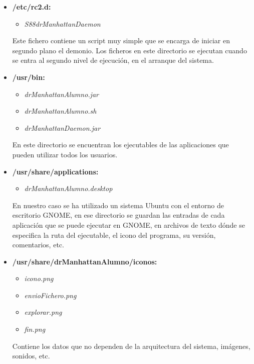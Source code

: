 \begin{itemize}

    \item {\bfseries /etc/rc2.d:}
    \begin{itemize}
        \item \emph{S88drManhattanDaemon}
    \end{itemize}

    Este fichero contiene un script muy simple que se encarga de iniciar en segundo plano el demonio. Los ficheros en este directorio se ejecutan cuando se entra al segundo nivel de ejecución, en el arranque del sistema.


    \item {\bfseries /usr/bin:}
    \begin{itemize}
        \item \emph{drManhattanAlumno.jar}
        \item \emph{drManhattanAlumno.sh}
        \item \emph{drManhattanDaemon.jar}
    \end{itemize}

    En este directorio se encuentran los ejecutables de las aplicaciones que pueden utilizar todos los usuarios.

    \item {\bfseries /usr/share/applications:}
    \begin{itemize}
        \item \emph{drManhattanAlumno.desktop}
    \end{itemize}

    En nuestro caso se ha utilizado un sistema Ubuntu con el entorno de escritorio GNOME, en ese directorio se guardan las entradas de cada aplicación que se puede ejecutar en GNOME, en archivos de texto dónde se especifica la ruta del ejecutable, el icono del programa, su versión, comentarios, etc.


    \item {\bfseries /usr/share/drManhattanAlumno/iconos:}
    \begin{itemize}
        \item \emph{icono.png}
        \item \emph{envioFichero.png}
        \item \emph{explorar.png}
        \item \emph{fin.png}
    \end{itemize}

    Contiene los datos que no dependen de la arquitectura del sistema, imágenes, sonidos, etc.


\end{itemize}

